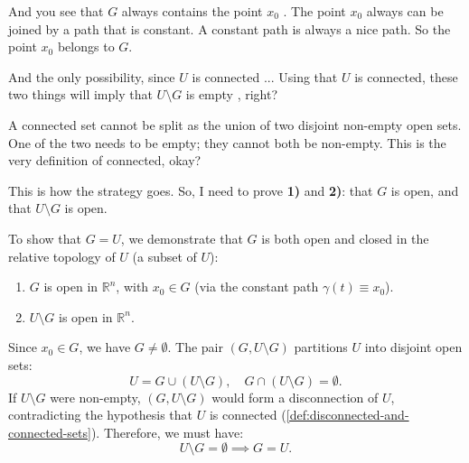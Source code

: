 \begin{proofWrapper}
\begin{speech}[01:04:40 - 01:06:17]
And you see that $G$ always contains the point $x_0$ . The point $x_0$ always can be joined by a path that is constant. A constant path is always a nice path. So the point $x_0$ belongs to $G$.

And the only possibility, since $U$ is connected ... Using that $U$ is connected, these two things will imply that $U \setminus G$ is empty , right?

A connected set cannot be split as the union of two disjoint non-empty open sets. One of the two needs to be empty; they cannot both be non-empty. This is the very definition of connected, okay?

This is how the strategy goes. So, I need to prove \textbf{1)} and \textbf{2)}: that $G$ is open, and that $U \setminus G$ is open.
\end{speech}

\begin{content}
To show that $G = U$, we demonstrate that $G$ is both open and closed in the relative topology of $U$ (a  subset of $U$):
\begin{enumerate}[label=\textbf{\arabic*)}]
    \item $G$ is open in $\mathbb{R}^n$, with $x_0 \in G$ (via the constant path $\gamma(t) \equiv x_0$).
    \item $U \setminus G$ is open in $\mathbb{R}^n$.
\end{enumerate}

\begin{steps}
Since $x_0 \in G$, we have $G \neq \emptyset$. The pair $(G, U \setminus G)$ partitions $U$ into disjoint open sets:
\[
U = G \cup (U \setminus G), \quad G \cap (U \setminus G) = \emptyset.
\]
If $U \setminus G$ were non-empty, $(G, U \setminus G)$ would form a disconnection of $U$, contradicting the hypothesis that $U$ is connected (\cref{def:disconnected-and-connected-sets}). Therefore, we must have:
\[
U \setminus G = \emptyset \implies G = U.
\]
\end{steps}
\end{content}

\begin{hidden}
\end{hidden}


\end{proofWrapper}
